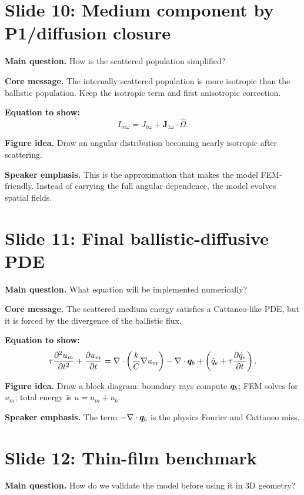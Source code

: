 \documentclass[11pt]{article}
\begin{document}
\section{Slide 10: Medium component by P1/diffusion closure}
\begin{physicsbox}
\textbf{Main question.} How is the scattered population simplified?
\end{physicsbox}

\textbf{Core message.} The internally scattered population is more isotropic than the ballistic population. Keep the isotropic term and first anisotropic correction.

\textbf{Equation to show:}
\begin{equation*}
I_{m\omega}=J_{0\omega}+\bm{J}_{1\omega}\cdot\hat{\Omega}.
\end{equation*}

\textbf{Figure idea.} Draw an angular distribution becoming nearly isotropic after scattering.

\textbf{Speaker emphasis.} This is the approximation that makes the model FEM-friendly. Instead of carrying the full angular dependence, the model evolves spatial fields.

\section{Slide 11: Final ballistic-diffusive PDE}
\begin{physicsbox}
\textbf{Main question.} What equation will be implemented numerically?
\end{physicsbox}

\textbf{Core message.} The scattered medium energy satisfies a Cattaneo-like PDE, but it is forced by the divergence of the ballistic flux.

\textbf{Equation to show:}
\begin{equation*}
\tau\frac{\partial^2 u_m}{\partial t^2}
+\frac{\partial u_m}{\partial t}
=\nabla\cdot\left(\frac{k}{C}\nabla u_m\right)
-\nabla\cdot\bm{q}_b
+\left(\dot{q}_e+\tau\frac{\partial\dot{q}_e}{\partial t}\right).
\end{equation*}

\textbf{Figure idea.} Draw a block diagram: boundary rays compute \(\bm{q}_b\); FEM solves for \(u_m\); total energy is \(u=u_m+u_b\).

\textbf{Speaker emphasis.} The term \(-\nabla\cdot\bm{q}_b\) is the physics Fourier and Cattaneo miss.

\section{Slide 12: Thin-film benchmark}
\begin{physicsbox}
\textbf{Main question.} How do we validate the model before using it in 3D geometry?
\end{physicsbox}
\end{document}
